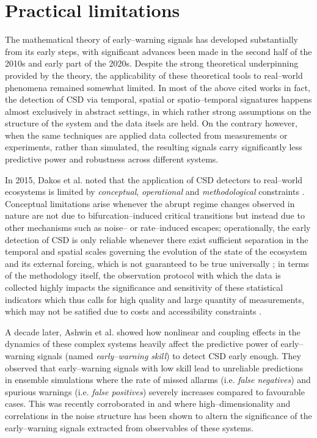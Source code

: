 \section{Practical limitations}
The mathematical theory of early--warning signals has developed substantially from its early steps, with significant advances been made in the second half of the 2010s and early part of the 2020s.
Despite the strong theoretical underpinning provided by the theory, the applicability of these theoretical tools to real--world phenomena remained somewhat limited.
In most of the above cited works in fact, the detection of CSD via temporal, spatial or spatio--temporal signatures happens almost exclusively in abstract settings, in which rather strong assumptions on the structure of the system and the data itsels are held.
On the contrary however, when the same techniques are applied data collected from measurements or experiments, rather than simulated, the resulting signals carry significantly less predictive power and robustness across different systems.

In 2015, Dakos et al. noted that the application of CSD detectors to real--world ecosystems is limited by \emph{conceptual}, \emph{operational} and \emph{methodological} constraints \cite{Dakos2015}.
Conceptual limitations arise whenever the abrupt regime changes observed in nature are not due to bifurcation--induced critical transitions but instead due to other mechanisms such as noise-- or rate--induced escapes; operationally, the early detection of CSD is only reliable whenever there exist sufficient separation in the temporal and spatial scales governing the evolution of the state of the ecosystem and its external forcing, which is not guaranteed to be true universally \cite{Parry2026}; in terms of the methodology itself, the observation protocol with which the data is collected highly impacts the significance and sensitivity of these statistical indicators which thus calls for high quality and large quantity of measurements, which may not be satified due to costs and accessibility constraints \cite{Chen2022}.

A decade later, Ashwin et al. \cite{Ashwin2025} showed how nonlinear and coupling effects in the dynamics of these complex systems heavily affect the predictive power of early--warning signals (named \emph{early--warning skill}) to detect CSD early enough.
They observed that early--warning signals with low skill lead to unreliable predictions in ensemble simulations where the rate of missed allarms (i.e. \emph{false negatives}) and spurious warnings (i.e. \emph{false positives}) severely increases compared to favourable cases.
This was recently corroborated in \cite{Morr2024a} and \cite{Ditlevsen2026} where high--dimensionality and correlations in the noise structure has been shown to altern the significance of the early--warning signals extracted from observables of these systems.

